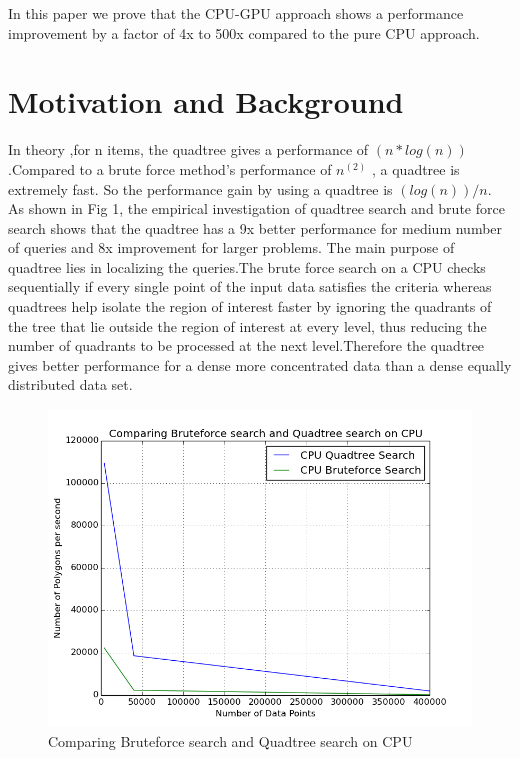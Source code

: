 \documentclass{article}
\begin{document}
In this paper we prove that the CPU-GPU approach shows a performance improvement by a factor of 4x to 500x compared to the pure CPU approach.





\section{Motivation and Background}

In theory ,for n items, the quadtree gives a  performance of ${(n*log(n))}$ .Compared to a brute force method's performance of $n^{(2)}$ , a quadtree is extremely fast. So the performance gain by using a quadtree is ${(log(n))/n}$.  
As shown in Fig 1, the empirical investigation of quadtree search and brute force search shows that the quadtree has a 9x better performance for medium number of queries and 8x improvement for larger problems.
The main purpose of quadtree lies in localizing the queries.The brute force search on a CPU checks sequentially if every single point of the input data satisfies the criteria whereas quadtrees help isolate the region of interest faster by ignoring the quadrants of the tree that lie outside the region of interest at every level, thus reducing the number of quadrants to be processed at the next level.Therefore the quadtree gives better performance for a dense more concentrated data than a dense equally distributed data set.


\begin{figure}[H]
\centering
    \includegraphics[scale=0.55]{BruteVsQuadCPU_logscale_new_2}
    \caption{Comparing Bruteforce search and Quadtree search on CPU}
  \end{figure}
\end{document}
